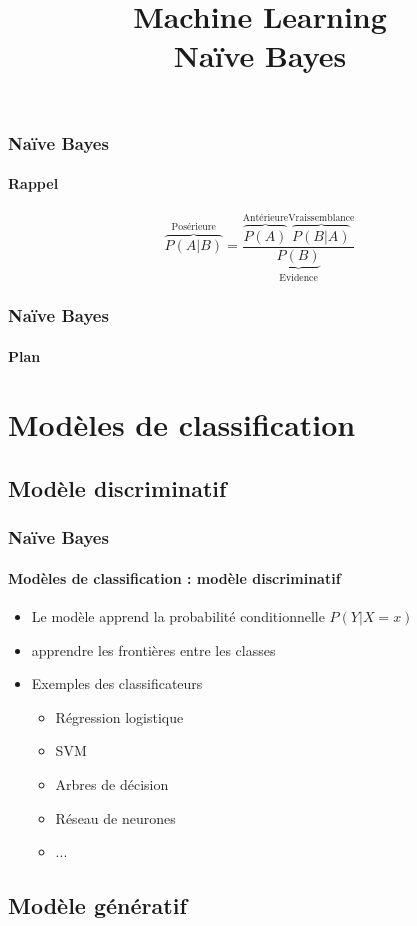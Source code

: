 \documentclass[xcolor=table]{beamer}
\title[ML: Naïve Bayes] %
{Machine Learning \\Naïve Bayes}
\begin{document}
\begin{frame}
\frametitle{Naïve Bayes}
\framesubtitle{Rappel}
\huge
\[
\overbrace{P(A|B)}^\text{Posérieure} = \frac{\overbrace{P(A)}^\text{Antérieure} \overbrace{P(B|A)}^{\text{Vraissemblance}}}{\underbrace{P(B)}_\text{Evidence}}
\]
\end{frame}

\begin{frame}
\frametitle{Naïve Bayes}
\framesubtitle{Plan}

\begin{multicols}{2}
	\tableofcontents
\end{multicols}
\end{frame}

\section{Modèles de classification}

\subsection{Modèle discriminatif}

\begin{frame}
	\frametitle{Naïve Bayes}
	\framesubtitle{Modèles de classification : modèle discriminatif}
	
	\begin{itemize}
		\item Le modèle apprend la probabilité conditionnelle $P(Y|X=x)$
		\item apprendre les frontières entre les classes
		\item Exemples des classificateurs 
		\begin{itemize}
			\item Régression logistique
			\item SVM
			\item Arbres de décision 
			\item Réseau de neurones 
			\item ...
		\end{itemize}
	\end{itemize}
	
\end{frame}

\subsection{Modèle génératif}
\end{document}
